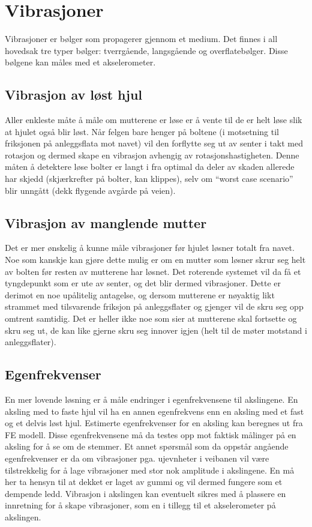 \section{Vibrasjoner}
Vibrasjoner er bølger som propagerer gjennom et medium. Det finnes i 
all hovedsak tre typer bølger: tverrgående, langsgående og overflatebølger. 
Disse bølgene kan måles med et akselerometer.

\subsection{Vibrasjon av løst hjul}
Aller enkleste måte å måle om mutterene er løse er å vente til 
de er helt løse slik at hjulet også blir løst. Når felgen bare 
henger på boltene (i motsetning til friksjonen på anleggsflata 
mot navet) vil den forflytte seg ut av senter i takt med rotasjon 
og dermed skape en vibrasjon avhengig av rotasjonshastigheten. 
Denne måten å detektere løse bolter er langt i fra optimal da deler 
av skaden allerede har skjedd (skjærkrefter på bolter, kan klippes),
 selv om ``worst case scenario'' blir unngått (dekk flygende avgårde på veien).

\subsection{Vibrasjon av manglende mutter}
Det er mer ønskelig å kunne måle vibrasjoner før hjulet løsner totalt
fra navet. Noe som kanskje kan gjøre dette mulig er om en mutter som løsner
skrur seg helt av bolten før resten av mutterene har løsnet. Det roterende systemet vil
da få et tyngdepunkt som er ute av senter, og det blir dermed vibrasjoner.
Dette er derimot en noe upålitelig antagelse, og dersom mutterene er nøyaktig
likt strammet med tilsvarende friksjon på anleggsflater og gjenger vil de skru seg opp omtrent samtidig.
Det er heller ikke noe som sier at mutterene skal fortsette og skru seg ut, de kan like 
gjerne skru seg innover igjen (helt til de møter motstand i anleggsflater).

\subsection{Egenfrekvenser}
En mer lovende løsning er å måle endringer i egenfrekvensene til 
akslingene. En aksling med to faste hjul vil ha en annen egenfrekvens 
enn en aksling med et fast og et delvis løst hjul. Estimerte egenfrekvenser 
for en aksling kan beregnes ut fra FE modell. Disse egenfrekvensene må %
da testes opp mot faktisk målinger på en aksling for å se om de stemmer. 
Et annet spørsmål som da oppstår angående egenfrekvenser er da om 
vibrasjoner pga. ujevnheter i veibanen vil være tilstrekkelig for å lage 
vibrasjoner med stor nok amplitude i akslingene. En må her ta hensyn til 
at dekket er laget av gummi og vil dermed fungere som et dempende ledd. 
Vibrasjon i akslingen kan eventuelt sikres med å plassere en innretning for 
å skape vibrasjoner, som en i tillegg til et akselerometer på akslingen.
